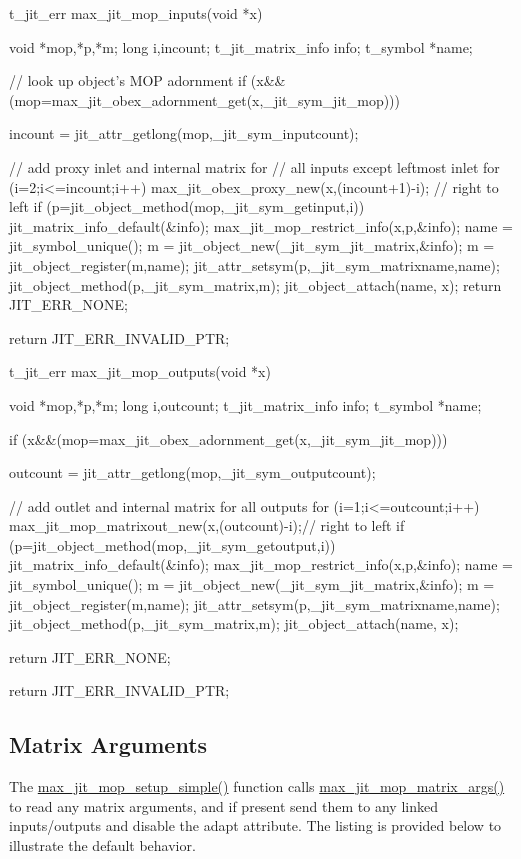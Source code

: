 \begin{DoxyCode}
t_jit_err max_jit_mop_inputs(void *x)
{
   void *mop,*p,*m;
   long i,incount;
   t_jit_matrix_info info;
   t_symbol *name;
   
   // look up object's MOP adornment
   if (x&&(mop=max_jit_obex_adornment_get(x,_jit_sym_jit_mop))) 
   {
      incount  = jit_attr_getlong(mop,_jit_sym_inputcount);
      
      // add proxy inlet and internal matrix for
      // all inputs except leftmost inlet 
      for (i=2;i<=incount;i++) {
         max_jit_obex_proxy_new(x,(incount+1)-i); // right to left
         if (p=jit_object_method(mop,_jit_sym_getinput,i)) {
            jit_matrix_info_default(&info);
            max_jit_mop_restrict_info(x,p,&info);
            name = jit_symbol_unique();
            m = jit_object_new(_jit_sym_jit_matrix,&info);
            m = jit_object_register(m,name);
            jit_attr_setsym(p,_jit_sym_matrixname,name);
            jit_object_method(p,_jit_sym_matrix,m);
            jit_object_attach(name, x);
         }
      }   
      return JIT_ERR_NONE;
   } 
   return JIT_ERR_INVALID_PTR;
}

t_jit_err max_jit_mop_outputs(void *x)
{
   void *mop,*p,*m;
   long i,outcount;
   t_jit_matrix_info info;
   t_symbol *name;

   if (x&&(mop=max_jit_obex_adornment_get(x,_jit_sym_jit_mop))) 
   {
      outcount = jit_attr_getlong(mop,_jit_sym_outputcount);

      // add outlet and internal matrix for all outputs
      for (i=1;i<=outcount;i++) {
         max_jit_mop_matrixout_new(x,(outcount)-i);// right to left
         if (p=jit_object_method(mop,_jit_sym_getoutput,i)) {
            jit_matrix_info_default(&info);
            max_jit_mop_restrict_info(x,p,&info);
            name = jit_symbol_unique();
            m = jit_object_new(_jit_sym_jit_matrix,&info);
            m = jit_object_register(m,name);
            jit_attr_setsym(p,_jit_sym_matrixname,name);
            jit_object_method(p,_jit_sym_matrix,m);
            jit_object_attach(name, x);
         }
      }

      return JIT_ERR_NONE;
   } 
   return JIT_ERR_INVALID_PTR;
}
\end{DoxyCode}
\hypertarget{chapter_jit_mopdetails_chapter_jit_mopdetails_maxclassctor_matargs}{}\subsection{Matrix Arguments}\label{chapter_jit_mopdetails_chapter_jit_mopdetails_maxclassctor_matargs}
The \hyperlink{group__maxmopmod_gac3eaca207281516b72e81f0dc5f4bf94}{max\_\-jit\_\-mop\_\-setup\_\-simple()} function calls \hyperlink{group__maxmopmod_ga75f7f306602775484eaa1b3f9d3998f3}{max\_\-jit\_\-mop\_\-matrix\_\-args()} to read any matrix arguments, and if present send them to any linked inputs/outputs and disable the adapt attribute. The listing is provided below to illustrate the default behavior.


